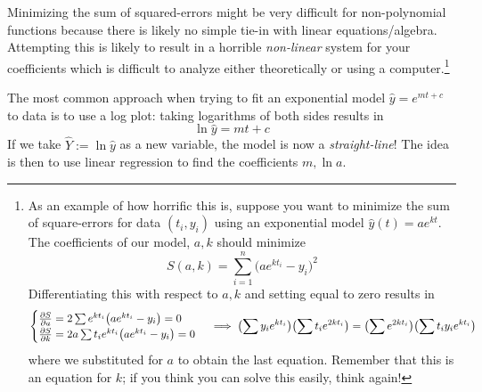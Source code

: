 Minimizing the sum of squared-errors might be very difficult for non-polynomial functions because there is likely no simple tie-in with linear equations/algebra. Attempting this is likely to result in a horrible \emph{non-linear} system for your coefficients which is difficult to analyze either theoretically or using a computer.\footnote{%
	As an example of how horrific this is, suppose you want to minimize the sum of square-errors for data $(t_i,y_i)$ using an exponential model $\hat y(t)=ae^{kt}$. The coefficients of our model, $a,k$ should minimize
	\[
		S(a,k)=\sum_{i=1}^n\bigl(ae^{kt_i}-y_i\bigr)^2
	\]
	Differentiating this with respect to $a,k$ and setting equal to zero results in
	\[
		\begin{cases}
			\partials[S]{a}=2\sum e^{kt_i}\bigl(ae^{kt_i}-y_i\bigr)=0 \\
			\partials[S]{k}=2a\sum t_ie^{kt_i}\bigl(ae^{kt_i}-y_i\bigr)=0
		\end{cases}
		\implies  \bigl(\sum y_ie^{kt_i}\bigr)\bigl(\sum t_ie^{2kt_i}\bigr) =\bigl(\sum e^{2kt_i}\bigr)\bigl(\sum t_iy_ie^{kt_i}\bigr)
	\]
	where we substituted for $a$ to obtain the last equation. Remember that this is an equation for $k$; if you think you can solve this easily, think again!
}


The most common approach when trying to fit an exponential model $\hat y=e^{mt+c}$ to data is to use a log plot: taking logarithms of both sides results in
\[
	\ln\hat y=mt+c
\]
If we take $\hat Y:=\ln\hat y$ as a new variable, the model is now a \emph{straight-line}! The idea is then to use linear regression to find the coefficients $m,\ln a$.

